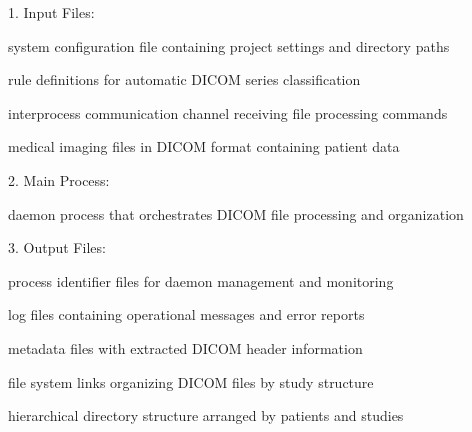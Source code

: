 \documentclass[letterpaper,10pt,english]{sphinxmanual}
\begin{document}
\sphinxAtStartPar
{}


\sphinxAtStartPar
{}

\begin{DUlineblock}{0em}
\item[] 1. Input Files:
\end{DUlineblock}

\begin{DUlineblock}{0em}
\item[] \sphinxhyphen{}  \sphinxhyphen{} system configuration file containing project settings and directory paths
\item[] \sphinxhyphen{}  \sphinxhyphen{} rule definitions for automatic DICOM series classification
\item[] \sphinxhyphen{}  \sphinxhyphen{} inter\sphinxhyphen{}process communication channel receiving file processing commands
\item[] \sphinxhyphen{}  \sphinxhyphen{} medical imaging files in DICOM format containing patient data
\end{DUlineblock}

\begin{DUlineblock}{0em}
\item[] 2. Main Process:
\end{DUlineblock}

\begin{DUlineblock}{0em}
\item[] \sphinxhyphen{}  \sphinxhyphen{} daemon process that orchestrates DICOM file processing and organization
\end{DUlineblock}

\begin{DUlineblock}{0em}
\item[] 3. Output Files:
\end{DUlineblock}

\begin{DUlineblock}{0em}
\item[] \sphinxhyphen{}  \sphinxhyphen{} process identifier files for daemon management and monitoring
\item[] \sphinxhyphen{}  \sphinxhyphen{} log files containing operational messages and error reports
\item[] \sphinxhyphen{}  \sphinxhyphen{} metadata files with extracted DICOM header information
\item[] \sphinxhyphen{}  \sphinxhyphen{} file system links organizing DICOM files by study structure
\item[] \sphinxhyphen{}  \sphinxhyphen{} hierarchical directory structure arranged by patients and studies
\end{DUlineblock}
\end{document}
